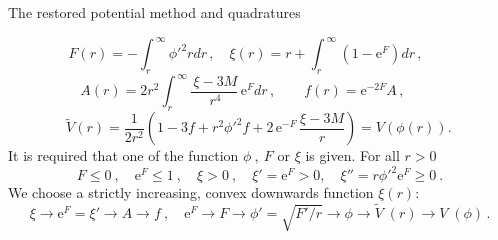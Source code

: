 \documentclass[12pt,aspectratio=139, slidestop,notes=hide]{beamer}
\begin{document}
\begin{frame}
{\centerline{The restored potential method and quadratures\quad}}

\vspace{-1ex}
\begin{equation}\label{F-xi}
F(r)=-\!\int_{r}^{\,\infty}\!\! {\phi'}^{2}rdr\,,\quad \xi(r)=r+\int_{r}^{\,\infty}\!\!
\left(1-\mathrm{e}^F\right)\!dr\,,\qquad\!
\end{equation}
\begin{equation}\label{A-f}
A(r)=2r^{2}\!\!\int_{r}^{\,\infty}\! \frac{\,\xi-3M}{\,r^4}\,\mathrm{e}^{F}dr\,, \qquad f(r)=\mathrm{e}^{-2F}A\,,\qquad\;\,
\end{equation}
\begin{equation}\label{V}
\widetilde{V}(r)\!=\!\frac{1}{2r^2}\! \left(\!1\!-\!3f\!+\! r^2{\phi'}^{2}\!f\!+\! 2\,\mathrm{e}^{-F}\,\frac{\xi\!-\!3M}{r}\right)\!= V(\phi(r)).\,
\end{equation}
It is required that one of the function $\phi\!\:,\!\: F$ or $\xi$ is given. For all $r>0$
\begin{equation}\label{cond1}
F\leq0\!\:,  \quad \mathrm{e}^F\leq1\!\:,  \quad \xi>0\!\:, \quad \xi'=\mathrm{e}^F>0, \quad  \xi''= r{\phi'}^2\mathrm{e}^F\geq0\!\:.
\end{equation}
We choose a strictly increasing, convex downwards function $\xi(r)$:
\begin{equation}\label{}
\xi \!\rightarrow\! \mathrm{e}^{F}\!\!= \xi' \!\rightarrow\! A \!\rightarrow\! f\!\:,
\quad
\mathrm{e}^{F} \!\rightarrow\! F \!\rightarrow\! \phi'\!=\!\sqrt{F'/r} \!\rightarrow\! \phi \!\rightarrow\! \widetilde{V}\!\!\;(r) \!\rightarrow\! V\!\!\;(\phi)\,. \nonumber
\end{equation}

\end{frame}
\end{document}
